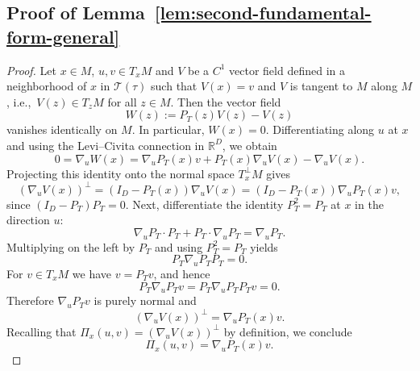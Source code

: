 \documentclass[11pt]{article}
\theoremstyle{plain}
\theoremstyle{definition}
\begin{document}
\subsection{Proof of Lemma~\ref{lem:second-fundamental-form-general}}\label{sec:pf-second fundamental form_general}
\begin{proof}
Let $x\in M$, $u,v\in T_xM$ and $V$ be a $C^1$ vector field defined in a neighborhood of $x$ in $\mathcal T(\tau)$ such that $V(x)=v$ and $V$ is tangent to $M$ along $M$, i.e.,\ $V(z)\in T_zM$ for all $z\in M$. Then the vector field
\[
W(z) := P_T(z)V(z) - V(z)
\]
vanishes identically on $M$. In particular, $W(x)=0$. Differentiating along $u$ at $x$ and using the Levi--Civita connection in $\mathbb{R}^D$, we obtain
\[
0
=
\nabla_u W(x)
=
\nabla_u P_T(x)v
+
P_T(x)\nabla_u V(x)
-
\nabla_u V(x).
\]
Projecting this identity onto the normal space $T_x^\perp M$ gives
\[
(\nabla_u V(x))^\perp
=
(I_D-P_T(x))\nabla_u V(x)
=
(I_D-P_T(x))\nabla_uP_T(x)v,
\]
since $(I_D-P_T)P_T=0$. Next, differentiate the identity $P_T^2=P_T$ at $x$ in the direction $u$:
\[
\nabla_uP_T\cdot P_T + P_T\cdot\nabla_uP_T = \nabla_uP_T.
\]
Multiplying on the left by $P_T$ and using $P_T^2=P_T$ yields
\[
P_T\nabla_uP_TP_T = 0.
\]
For $v\in T_xM$ we have $v=P_Tv$, and hence
\[
P_T\nabla_uP_Tv = P_T\nabla_uP_TP_Tv = 0.
\]
Therefore $\nabla_uP_Tv$ is purely normal and
\[
(\nabla_u V(x))^\perp = \nabla_uP_T(x)v.
\]
Recalling that $\Pi_x(u,v)=(\nabla_u V(x))^\perp$ by definition, we conclude
\[
\Pi_{x}(u,v)
=
\nabla_uP_T(x)v.
\]
\end{proof}

\vskip 0.2in


  
\end{document}
